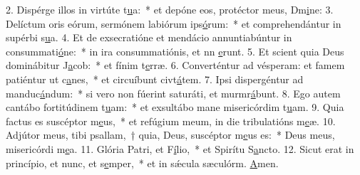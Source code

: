 2. Dispérge illos in virtúte t\uline{u}a:~* et depóne eos, protéctor meus, Dm\uline{i}ne:
3. Delíctum oris eórum, sermónem labiórum ips\uline{ó}rum:~* et comprehendántur in supérbi s\uline{u}a.
4. Et de exsecratióne et mendácio annuntiabúntur in consummati\uline{ó}ne:~* in ira consummatiónis, et nn \uline{e}runt.
5. Et scient quia Deus dominábitur J\uline{a}cob:~* et fínim t\uline{e}rræ.
6. Converténtur ad vésperam: et famem patiéntur ut c\uline{a}nes,~* et circuíbunt civt\uline{á}tem.
7. Ipsi dispergéntur ad manduc\uline{á}ndum:~* si vero non fúerint saturáti, et murmr\uline{á}bunt.
8. Ego autem cantábo fortitúdinem t\uline{u}am:~* et exsultábo mane misericórdim t\uline{u}am.
9. Quia factus es suscéptor m\uline{e}us,~* et refúgium meum, in die tribulatións m\uline{e}æ.
10. Adjútor meus, tibi psallam,~† quia, Deus, suscéptor m\uline{e}us es:~* Deus meus, misericórdi m\uline{e}a.
11. Glória Patri, et F\uline{í}lio,~* et Spirítu S\uline{a}ncto.
12. Sicut erat in princípio, et nunc, et s\uline{e}mper,~* et in sǽcula sæculórm. \uline{A}men.
